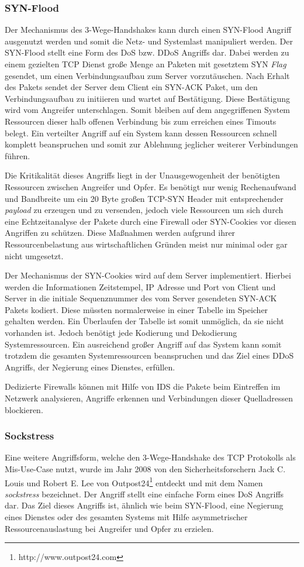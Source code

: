 \subsubsection{SYN-Flood}
Der Mechanismus des 3-Wege-Handshakes kann durch einen SYN-Flood Angriff ausgenutzt werden und somit die Netz- und Systemlast manipuliert werden. Der SYN-Flood stellt eine Form des \ac{DoS} bzw. \ac{DDoS} Angriffs dar. Dabei werden zu einem gezielten \ac{TCP} Dienst große Menge an Paketen mit gesetztem SYN \textit{Flag} gesendet, um einen Verbindungsaufbau zum Server vorzutäuschen. Nach Erhalt des Pakets sendet der Server dem Client ein SYN-ACK Paket, um den Verbindungsaufbau zu initiieren und wartet auf Bestätigung. Diese Bestätigung wird vom Angreifer unterschlagen. Somit bleiben auf dem angegriffenen System Ressourcen dieser halb offenen Verbindung bis zum erreichen eines Timouts belegt. Ein verteilter Angriff auf ein System kann dessen Ressourcen schnell komplett beanspruchen und somit zur Ablehnung jeglicher weiterer Verbindungen führen.

Die Kritikalität dieses Angriffs liegt in der Unausgewogenheit der benötigten Ressourcen zwischen Angreifer und Opfer. Es benötigt nur wenig Rechenaufwand und Bandbreite um ein 20 Byte großen \ac{TCP}-SYN Header mit entsprechender \textit{payload} zu erzeugen und zu versenden, jedoch viele Ressourcen um sich durch eine Echtzeitanalyse der Pakete durch eine Firewall oder SYN-Cookies vor diesen Angriffen zu schützen. Diese Maßnahmen werden aufgrund ihrer Ressourcenbelastung aus wirtschaftlichen Gründen meist nur minimal oder gar nicht umgesetzt.

Der Mechanismus der SYN-Cookies wird auf dem Server implementiert. Hierbei werden die Informationen Zeitstempel, \ac{IP} Adresse und Port von Client und Server in die initiale Sequenznummer des vom Server gesendeten SYN-ACK Pakets kodiert. Diese müssten normalerweise in einer Tabelle im Speicher gehalten werden. Ein Überlaufen der Tabelle ist somit unmöglich, da sie nicht vorhanden ist. Jedoch benötigt jede Kodierung und Dekodierung Systemressourcen. Ein ausreichend großer Angriff auf das System kann somit trotzdem die gesamten Systemressourcen beanspruchen und das Ziel eines \ac{DDoS} Angriffs, der Negierung eines Dienstes, erfüllen.

Dedizierte Firewalls können mit Hilfe von \ac{IDS} die Pakete beim Eintreffen im Netzwerk analysieren, Angriffe erkennen und Verbindungen dieser Quelladressen blockieren.

\subsubsection{Sockstress}
Eine weitere Angriffsform, welche den 3-Wege-Handshake des \ac{TCP} Protokolls als Mis-Use-Case nutzt, wurde im Jahr 2008 von den Sicherheitsforschern Jack C. Louis und Robert E. Lee von Outpost24\footnote{http://www.outpost24.com} entdeckt und mit dem Namen \textit{sockstress} bezeichnet. Der Angriff stellt eine einfache Form eines \ac{DoS} Angriffs dar. Das Ziel dieses Angriffs ist, ähnlich wie beim SYN-Flood, eine Negierung eines Dienstes oder des gesamten Systems mit Hilfe asymmetrischer Ressourcenauslastung bei Angreifer und Opfer zu erzielen.

